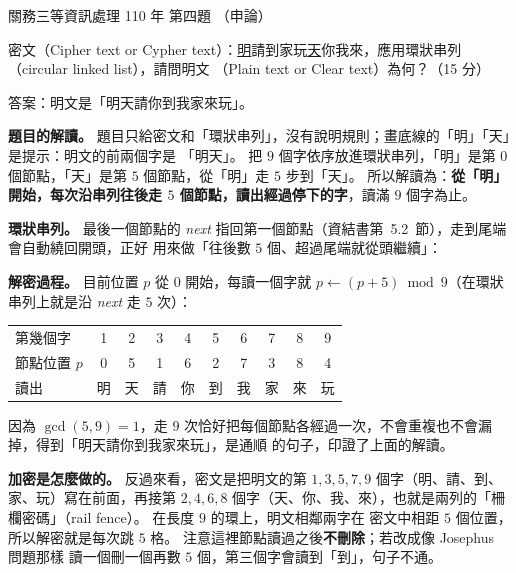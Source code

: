 \begin{pastexam}[label={px:gw3-110-ds-04}]{關務三等資訊處理 110 年 第四題}
（申論）

密文（Cipher text or Cypher text）：\underline{明}請到家玩\underline{天}你我來，應用環狀串列（circular linked list），請問明文
（Plain text or Clear text）為何？（15 分）
\end{pastexam}

\begin{pastsoln}
答案：明文是「明天請你到我家來玩」。

\textbf{題目的解讀。} 題目只給密文和「環狀串列」，沒有說明規則；畫底線的「明」「天」是提示：明文的前兩個字是
「明天」。 把 $9$ 個字依序放進環狀串列，「明」是第 $0$ 個節點，「天」是第 $5$ 個節點，從「明」走 $5$ 步到「天」。
所以解讀為：\textbf{從「明」開始，每次沿串列往後走 $5$ 個節點，讀出經過停下的字}，讀滿 $9$ 個字為止。

\textbf{環狀串列。} 最後一個節點的 \textit{next} 指回第一個節點（資結書第~5.2~節），走到尾端會自動繞回開頭，正好
用來做「往後數 $5$ 個、超過尾端就從頭繼續」：
\begin{center}
\end{center}

\textbf{解密過程。} 目前位置 $p$ 從 $0$ 開始，每讀一個字就 $p \gets (p + 5) \bmod 9$（在環狀串列上就是沿 \textit{next}
走 $5$ 次）：
\begin{center}
\begin{tabular}{lccccccccc}
\toprule
第幾個字 & 1 & 2 & 3 & 4 & 5 & 6 & 7 & 8 & 9 \\
節點位置 $p$ & 0 & 5 & 1 & 6 & 2 & 7 & 3 & 8 & 4 \\
讀出 & 明 & 天 & 請 & 你 & 到 & 我 & 家 & 來 & 玩 \\
\bottomrule
\end{tabular}
\end{center}
因為 $\gcd(5, 9) = 1$，走 $9$ 次恰好把每個節點各經過一次，不會重複也不會漏掉，得到「明天請你到我家來玩」，是通順
的句子，印證了上面的解讀。

\textbf{加密是怎麼做的。} 反過來看，密文是把明文的第 $1, 3, 5, 7, 9$ 個字（明、請、到、家、玩）寫在前面，再接第
$2, 4, 6, 8$ 個字（天、你、我、來），也就是兩列的「柵欄密碼」（rail fence）。 在長度 $9$ 的環上，明文相鄰兩字在
密文中相距 $5$ 個位置，所以解密就是每次跳 $5$ 格。 注意這裡節點讀過之後\textbf{不刪除}；若改成像 Josephus 問題那樣
讀一個刪一個再數 $5$ 個，第三個字會讀到「到」，句子不通。
\end{pastsoln}
